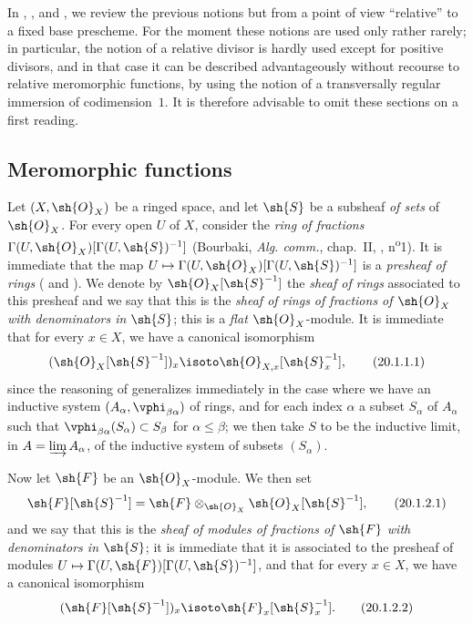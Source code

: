 In , , and , we review the previous notions but from a point of view ``relative'' to a fixed base prescheme.
For the moment these notions are used only rather rarely; in particular, the notion of a relative divisor is hardly used except for positive divisors, and in that case it can be described advantageously without recourse to relative meromorphic functions, by using the notion of a transversally regular immersion of codimension~$1$.
It is therefore advisable to omit these sections on a first reading.

\subsection{Meromorphic functions}
\label{IV.20.1}

\begin{env}[20.1.1]
\label{IV.20.1.1}
Let $(X,\sh{O}_X)$ be a ringed space, and let $\sh{S}$ be a subsheaf \emph{of sets} of $\sh{O}_X$.
For every open $U$ of $X$, consider the \emph{ring of fractions} $\Gamma(U,\sh{O}_X)[\Gamma(U,\sh{S})^{-1}]$ (Bourbaki, \emph{Alg. comm.}, chap.~II, , n\textsuperscript{o}1).
It is immediate that the map $U\mapsto\Gamma(U,\sh{O}_X)[\Gamma(U,\sh{S})^{-1}]$ is a \emph{presheaf of rings} ( and ).
We denote by $\sh{O}_X[\sh{S}^{-1}]$ the \emph{sheaf of rings} associated to this presheaf and we say that this is the \emph{sheaf of rings of fractions of $\sh{O}_X$ with denominators in $\sh{S}$};
this is a \emph{flat} $\sh{O}_X$-module.
It is immediate that for every $x\in X$, we have a canonical isomorphism
\[
\label{IV.20.1.1.1}
  (\sh{O}_X[\sh{S}^{-1}])_x\isoto\sh{O}_{X,x}[\sh{S}_x^{-1}],
  \tag{20.1.1.1}
\]
since the reasoning of  generalizes immediately in the case where we have an inductive system $(A_\alpha,\vphi_{\beta\alpha})$ of rings, and for each index $\alpha$ a subset $S_\alpha$ of $A_\alpha$ such that
$\vphi_{\beta\alpha}(S_\alpha)\subset S_\beta$ for $\alpha\leq\beta$;
we then take $S$ to be the inductive limit, in $A=\varinjlim A_\alpha$, of the inductive system of subsets $(S_\alpha)$.
\end{env}

\begin{env}[20.1.2]
Now let $\sh{F}$ be an $\sh{O}_X$-module.
We then set
\[
\label{IV.20.1.2.1}
  \sh{F}[\sh{S}^{-1}]=\sh{F}\otimes_{\sh{O}_X}\sh{O}_X[\sh{S}^{-1}],
  \tag{20.1.2.1}
\]
and we say that this is the \emph{sheaf of modules of fractions of $\sh{F}$ with denominators in $\sh{S}$};
it is immediate that it is associated to the presheaf of modules $U\mapsto\Gamma(U,\sh{F})[\Gamma(U,\sh{S})^{-1}]$, and that for every $x\in X$, we have a canonical isomorphism
\[
\label{IV.20.1.2.2}
  (\sh{F}[\sh{S}^{-1}])_x\isoto\sh{F}_x[\sh{S}_x^{-1}].
  \tag{20.1.2.2}
\]
\end{env}

